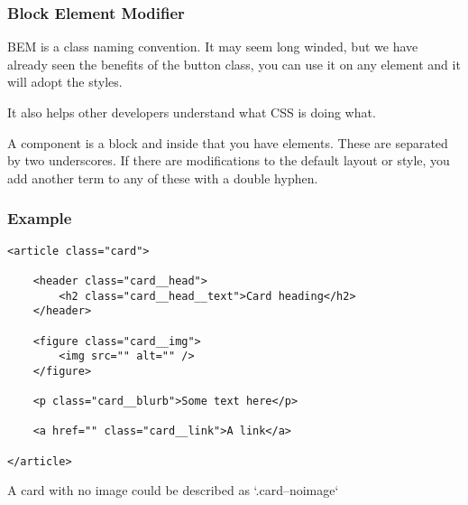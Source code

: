 \subsubsection{Block Element Modifier}

BEM is a class naming convention. It may seem long winded, but we have already seen the benefits of the button class, you can use it on any element and it will adopt the styles.

It also helps other developers understand what CSS is doing what.

A component is a block and inside that you have elements. These are separated by two underscores. If there are modifications to the default layout or style, you add another term to any of these with a double hyphen.

\subsubsection{Example}

\begin{verbatim}
<article class="card">

	<header class="card__head">
		<h2 class="card__head__text">Card heading</h2>
	</header>

	<figure class="card__img">
		<img src="" alt="" />
	</figure>

	<p class="card__blurb">Some text here</p>

	<a href="" class="card__link">A link</a>

</article>
\end{verbatim}

A card with no image could be described as `.card--noimage`

